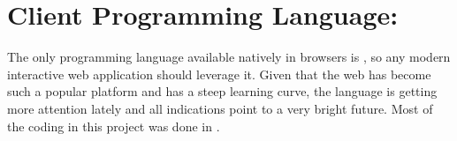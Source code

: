 \section{Client Programming Language: } %
\label{sec:javascript}

The only programming language available natively in browsers is , so any modern interactive web application should leverage it.
Given that the web has become such a popular platform and  has a steep learning curve, the language is getting more attention lately and all indications point to a very bright future.
Most of the coding in this project was done in .






